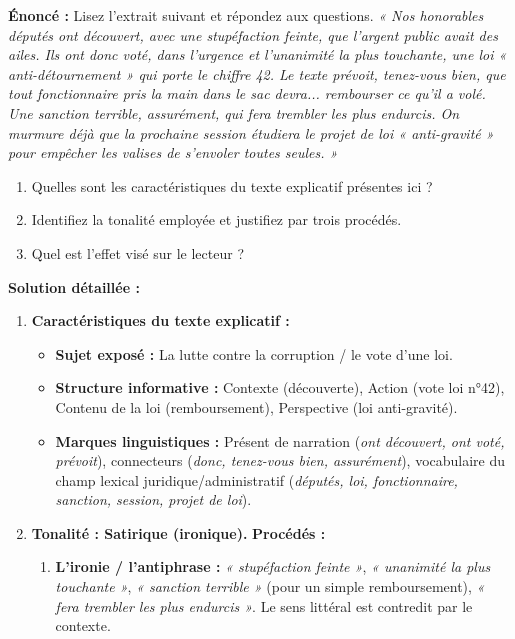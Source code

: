 \documentclass[11pt]{article}
\newcommand{\cle}[1]{{\popxbold\color{popdark}#1}}
\begin{document}
\begin{exoresolu}
    \textbf{Énoncé :} Lisez l'extrait suivant et répondez aux questions.
    \medskip
    \emph{« Nos honorables députés ont découvert, avec une stupéfaction feinte, que l'argent public avait des ailes. Ils ont donc voté, dans l'urgence et l'unanimité la plus touchante, une loi « anti-détournement » qui porte le chiffre 42. Le texte prévoit, tenez-vous bien, que tout fonctionnaire pris la main dans le sac devra... rembourser ce qu'il a volé. Une sanction terrible, assurément, qui fera trembler les plus endurcis. On murmure déjà que la prochaine session étudiera le projet de loi « anti-gravité » pour empêcher les valises de s'envoler toutes seules. »}
    \begin{enumerate}
        \item Quelles sont les caractéristiques du texte explicatif présentes ici ?
        \item Identifiez la tonalité employée et justifiez par trois procédés.
        \item Quel est l'effet visé sur le lecteur ?
    \end{enumerate}
    \tcblower
    \textbf{Solution détaillée :}
    \begin{enumerate}
        \item \textbf{Caractéristiques du texte explicatif :}
            \begin{itemize}
                \item \textbf{Sujet exposé :} La lutte contre la corruption / le vote d'une loi.
                \item \textbf{Structure informative :} Contexte (découverte), Action (vote loi n°42), Contenu de la loi (remboursement), Perspective (loi anti-gravité).
                \item \textbf{Marques linguistiques :} Présent de narration (\emph{ont découvert, ont voté, prévoit}), connecteurs (\emph{donc, tenez-vous bien, assurément}), vocabulaire du champ lexical juridique/administratif (\emph{députés, loi, fonctionnaire, sanction, session, projet de loi}).
            \end{itemize}
        \item \textbf{Tonalité : \cle{Satirique} (ironique).}
            \textbf{Procédés :}
            \begin{enumerate}
                \item \textbf{L'ironie / l'antiphrase :} \emph{« stupéfaction feinte »}, \emph{« unanimité la plus touchante »}, \emph{« sanction terrible »} (pour un simple remboursement), \emph{« fera trembler les plus endurcis »}. Le sens littéral est contredit par le contexte.

\end{enumerate}
\end{enumerate}
\end{exoresolu}
\end{document}

